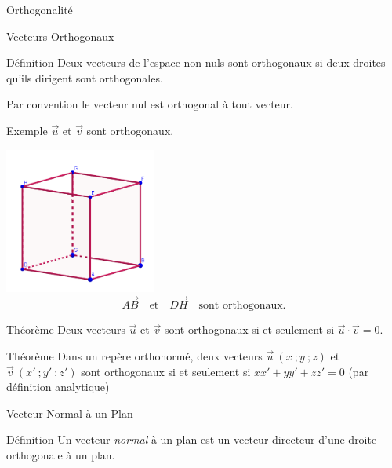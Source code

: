 \documentclass{coursbook}
\begin{document}
    \begin{Gpartie}{Orthogonalité} 
        \begin{Spartie}{Vecteurs Orthogonaux} 
            \begin{SSpartie}{Définition} 
                Deux vecteurs de l'espace non nuls sont orthogonaux si deux droites qu'ils dirigent sont orthogonales.

                Par convention le vecteur nul est orthogonal à tout vecteur.
                \begin{SSSpartie}{Exemple} 
                    $\vec{u}$ et $\vec{v}$ sont orthogonaux.

                    \begin{center}
                            \includegraphics[width=5cm]{rsc/12fig2.png}
                            \[\overrightarrow{AB}\quad\text{et}\quad\overrightarrow{DH}\quad\text{sont orthogonaux.}\]
                        \parbox{\linewidth}{}
                    \end{center}
                \end{SSSpartie}
            \end{SSpartie}
            \begin{SSpartie}{Théorème} 
                Deux vecteurs $\vec{u}$ et $\vec{v}$ sont orthogonaux si et seulement si $\vec{u}\cdot\vec{v}=0$.
            \end{SSpartie}
            \begin{SSpartie}{Théorème} 
                Dans un repère orthonormé, deux vecteurs $\vec{u}~\left(x~;y~;z\right)$ et $\vec{v}~\left(x'~;y'~;z'\right)$ sont orthogonaux si et seulement si $xx'+yy'+zz'=0$ (par définition analytique)
            \end{SSpartie}
        \end{Spartie} \pagebreak
        \begin{Spartie}{Vecteur Normal à un Plan} 
            \begin{SSpartie}{Définition} 
                Un vecteur \emph{normal} à un plan est un vecteur directeur d'une droite orthogonale à un plan.
    

\end{SSpartie}
\end{Spartie}
\end{Gpartie}
\end{document}
